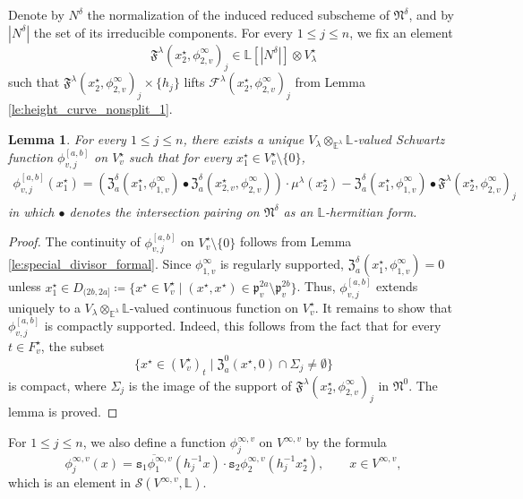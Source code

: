 \documentclass[12pt]{amsart}
\numberwithin{equation}{section}
\theoremstyle{plain}
\newtheorem{lem}[proposition]{Lemma}
\theoremstyle{definition}
\theoremstyle{remark}
\renewcommand{\c}[1]{\mathcal{#1}}
\renewcommand{\d}[1]{\mathbb{#1}}
\newcommand{\f}[1]{\mathfrak{#1}}
\newcommand{\s}[1]{\mathscr{#1}}
\renewcommand{\(}{\left(}
\renewcommand{\)}{\right)}
\newcommand{\res}{\mathbin{|}}
\newcommand{\ol}[1]{\overline{#1}{}}
\renewcommand{\leq}{\leqslant}
\newcommand{\cF}{\c F}
\newcommand{\dE}{\d E}
\newcommand{\dL}{\d L}
\newcommand{\fF}{\f F}
\newcommand{\fN}{\f N}
\newcommand{\fZ}{\f Z}
\newcommand{\fp}{\f p}
\newcommand{\sS}{\s S}
\newcommand{\ts}{\mathtt{s}}
\begin{document}
Denote by $N^\delta$ the normalization of the induced reduced subscheme of $\fN^\delta$, and by $|N^\delta|$ the set of its irreducible components. For every $1\leq j\leq n$, we fix an element
\[
\fF^\lambda(x^\star_2,\phi^\infty_{2,v})_j\in\dL[|N^\delta|]\otimes V^\star_\lambda
\]
such that $\fF^\lambda(x^\star_2,\phi^\infty_{2,v})_j\times\{h_j\}$ lifts $\cF^\lambda(x^\star_2,\phi^\infty_{2,v})_j$ from Lemma \ref{le:height_curve_nonsplit_1}.




\begin{lem}\label{le:height_curve_nonsplit_2}
For every $1\leq j\leq n$, there exists a unique $V_\lambda\otimes_{\dE^\lambda}\dL$-valued Schwartz function $\phi^{[a,b]}_{v,j}$ on $V^\star_v$ such that for every $x^\star_1\in V^\star_v\setminus\{0\}$,
\begin{align*}
\phi^{[a,b]}_{v,j}(x^\star_1)=
\(\fZ_a^\delta(x^\star_1,\phi^\infty_{1,v})\bullet\fZ_a^\delta(x^\star_{2,v},\phi^\infty_{2,v})\)
\cdot\mu^\lambda(x^\star_2)-\fZ_a^\delta(x^\star_1,\phi^\infty_{1,v})\bullet\fF^\lambda(x^\star_2,\phi^\infty_{2,v})_j
\end{align*}
in which $\bullet$ denotes the intersection pairing on $\fN^\delta$ as an $\dL$-hermitian form.
\end{lem}

\begin{proof}
The continuity of $\phi^{[a,b]}_{v,j}$ on $V^\star_v\setminus\{0\}$ follows from Lemma \ref{le:special_divisor_formal}. Since $\phi^\infty_{1,v}$ is regularly supported, $\fZ_a^\delta(x^\star_1,\phi^\infty_{1,v})=0$ unless
$x^\star_1\in D_{(2b,2a]}\coloneqq\{x^\star\in V^\star_v\res (x^\star,x^\star)\in\fp_v^{2a}\setminus\fp_v^{2b}\}$. Thus, $\phi^{[a,b]}_{v,j}$ extends uniquely to a $V_\lambda\otimes_{\dE^\lambda}\dL$-valued continuous function on $V^\star_v$. It remains to show that $\phi^{[a,b]}_{v,j}$ is compactly supported. Indeed, this follows from the fact that for every $t\in F_v^\star$, the subset
\[
\{x^\star\in(V^\star_v)_t\res \fZ_a^0(x^\star,0)\cap\Sigma_j\neq\emptyset\}
\]
is compact, where $\Sigma_j$ is the image of the support of $\fF^\lambda(x^\star_2,\phi^\infty_{2,v})_j$ in $\fN^0$. The lemma is proved.
\end{proof}


For $1\leq j\leq n$, we also define a function $\phi^{\infty,v}_j$ on $V^{\infty,v}$ by the formula
\[
\phi^{\infty,v}_j(x)=\ol{\ts_1\phi^{\infty,v}_1}(h_j^{-1}x)\cdot\ts_2\phi^{\infty,v}_2(h_j^{-1}x^\star_2),
\qquad x\in V^{\infty,v},
\]
which is an element in $\sS(V^{\infty,v},\dL)$.
\end{document}
